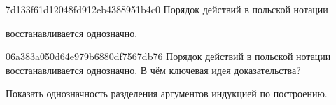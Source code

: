 \begin{note}{7d133f61d12048fd912eb4388951b4c0}
    Порядок действий в польской нотации \begin{icloze}{1}восстанавливается однозначно.\end{icloze}
\end{note}

\begin{note}{06a383a050d64e979b6880df7567db76}
    Порядок действий в польской нотации восстанавливается однозначно.
    В чём ключевая идея доказательства?

    \begin{cloze}{1}
        Показать однозначность разделения аргументов индукцией по построению.
    \end{cloze}
\end{note}


